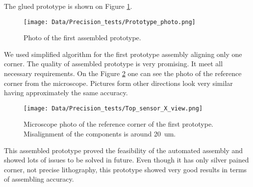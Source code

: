 The glued prototype is shown on Figure \ref{fig:module_prototype}.

\begin{figure}[ht]\centering
\texttt{[image: Data/Precision\_tests/Prototype\_photo.png]}
\caption{Photo of the first assembled prototype.}
\label{fig:module_prototype}
\end{figure}

We used simplified algorithm for the first prototype assembly aligning only one corner. The quality of assembled prototype is very promising. It meet all necessary requirements. On the Figure \ref{fig:prototype_macro} one can see the photo of the reference corner from the microscope. Pictures form other directions look very similar having approximately the same accuracy.

\begin{figure}[ht]\centering
\texttt{[image: Data/Precision\_tests/Top\_sensor\_X\_view.png]}
\caption{Microscope photo of the reference corner of the first prototype. Misalignment of the components is around 20~um.}
\label{fig:prototype_macro}
\end{figure}

This assembled prototype proved the feasibility of the automated assembly and showed lots of issues to be solved in future. Even though it has only silver pained corner, not precise lithography, this prototype showed very good results in terms of assembling accuracy.
